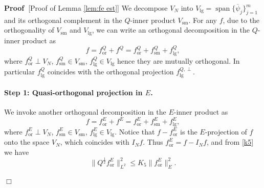 \documentclass[11pt,a4paper]{article}
\numberwithin{equation}{section}
\newcommand{\tmop}[1]{\ensuremath{\operatorname{#1}}}
\newenvironment{proof}{\noindent\textbf{Proof\ }}{\hspace*{\fill}$\Box$\medskip}
\begin{document}
\begin{proof}[Proof of Lemma \ref{lem:fe est}]
We decompose $V_N$ into $V_{\tmop{lg}}=\tmop{span}\{\overline\psi_j\}_{j=1}^m$ and its orthogonal complement in the $Q$-inner product $V_{\tmop{sm}}$. %
For any $f$, due to the orthogonality of $V_{\tmop{sm}}$ and $V_{\tmop{lg}}$, we can write an orthogonal decomposition in the $Q$-inner product as $$f=f^Q_{\tmop{or}}+f^Q=f^Q_{\tmop{or}}+f^Q_{\tmop{sm}}+f^Q_{\tmop{lg}},$$
  where $f^Q_{\tmop{or}}\perp V_N$, $f^Q_{\tmop{sm}}\in V_{\tmop{sm}}$, $f^Q_{\tmop{lg}}\in V_{\tmop{lg}}$ hence they are mutually orthogonal. In particular $f^Q_{\tmop{lg}}$ coincides with the orthogonal projection $f^{Q,\perp}_{\tmop{lg}}$.
  


\paragraph{Step 1: Quasi-orthogonal projection in $E$.}

We invoke another orthogonal decomposition in the $E$-inner product as 
$$f=f^E_{\tmop{or}}+f^E=f^E_{\tmop{or}}+f^E_{\tmop{sm}}+f^E_{\tmop{lg}},$$
where $f^E_{\tmop{or}}\perp V_N$, $f^E_{\tmop{sm}}\in V_{\tmop{sm}}$, $f^E_{\tmop{lg}}\in V_{\tmop{lg}}$.   Notice that $f-f^E_{\tmop{or}}$ is the $E$-projection of $f$ onto the space $V_N$, which coincides with $I_Nf$. Thus $f^E_{\tmop{or}}=f-I_Nf$, and %
 from \eqref{k5} we have \begin{equation}
      \label{k51}\| Q^{\frac{1}{2}} f^E_{\tmop{or}}
    \|_{L^2}^2\leqslant K_5 \|  f^E_{\tmop{or}} \|_{{E}}^2.\end{equation}
    

\end{proof}
\end{document}
